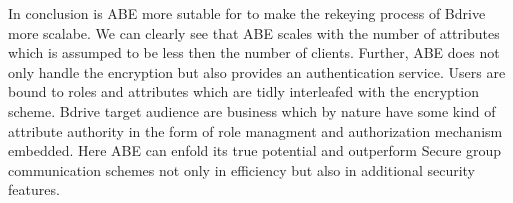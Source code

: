 In conclusion is ABE more sutable for to make the rekeying process of Bdrive more scalabe. We can clearly see that ABE scales with the number of attributes which is assumped to be less then the number of clients. Further, ABE does not only handle the encryption but also provides an authentication service. Users are bound to roles and attributes which are tidly interleafed with the encryption scheme. Bdrive target audience are business which by nature have some kind of attribute authority in the form of role managment and authorization mechanism embedded. Here ABE can enfold its true potential and outperform Secure group communication schemes not only in efficiency but also in additional security features. 


